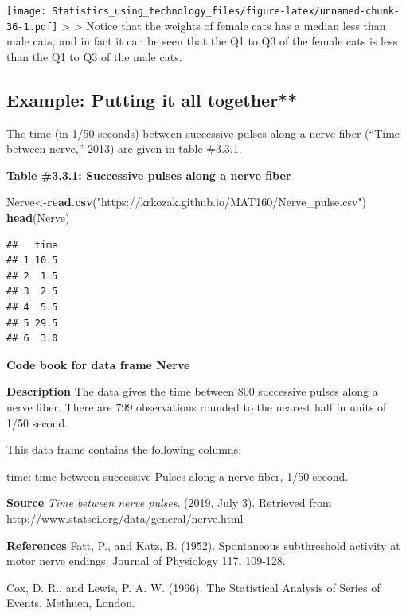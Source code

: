 \documentclass[]{book}
\newenvironment{Shaded}{\begin{snugshade}}{\end{snugshade}}
\newcommand{\KeywordTok}[1]{\textcolor[rgb]{0.13,0.29,0.53}{\textbf{#1}}}
\newcommand{\NormalTok}[1]{#1}
\newcommand{\StringTok}[1]{\textcolor[rgb]{0.31,0.60,0.02}{#1}}
\begin{document}
\texttt{[image: Statistics\_using\_technology\_files/figure-latex/unnamed-chunk-36-1.pdf]}
\textgreater{}
\textgreater{} Notice that the weights of female cats has a median less than male cats, and in fact it can be seen that the Q1 to Q3 of the female cats is less than the Q1 to Q3 of the male cats.

\hypertarget{example-putting-it-all-together}{%
\subsection{Example: Putting it all together**}\label{example-putting-it-all-together}}

The time (in 1/50 seconds) between successive pulses along a nerve fiber (``Time
between nerve,'' 2013) are given in table \#3.3.1.

\textbf{Table \#3.3.1: Successive pulses along a nerve fiber}

\begin{Shaded}
\begin{Highlighting}[]
\NormalTok{Nerve<-}\KeywordTok{read.csv}\NormalTok{(}\StringTok{"https://krkozak.github.io/MAT160/Nerve_pulse.csv"}\NormalTok{)}
\KeywordTok{head}\NormalTok{(Nerve)}
\end{Highlighting}
\end{Shaded}

\begin{verbatim}
##   time
## 1 10.5
## 2  1.5
## 3  2.5
## 4  5.5
## 5 29.5
## 6  3.0
\end{verbatim}

\textbf{Code book for data frame Nerve}

\textbf{Description}
The data gives the time between 800 successive pulses along a nerve fiber. There are 799 observations rounded to the nearest half in units of 1/50 second.

This data frame contains the following columns:

time: time between successive Pulses along a nerve fiber, 1/50 second.

\textbf{Source}
\emph{Time between nerve pulses}. (2019, July 3). Retrieved from
\url{http://www.statsci.org/data/general/nerve.html}

\textbf{References}
Fatt, P., and Katz, B. (1952). Spontaneous subthreshold activity at motor nerve endings. Journal of Physiology 117, 109-128.

Cox, D. R., and Lewis, P. A. W. (1966). The Statistical Analysis of Series of Events. Methuen, London.
\end{document}
